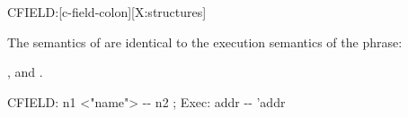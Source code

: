 \begin{worddef}{}{CFIELD:}[c-field-colon][X:structures]
\item \stack{}{}

	The semantics of  are identical to the
	execution semantics of the phrase:
	\begin{quote}  
	\end{quote}

\see {},
	 and
	.

	\begin{implement} %

		\word{:} CFIELD:\tab{} n1 <"name"> -{}- n2 ; Exec: addr -{}- 'addr \\
		   \\
		\word{;}
	\end{implement}
\end{worddef}


